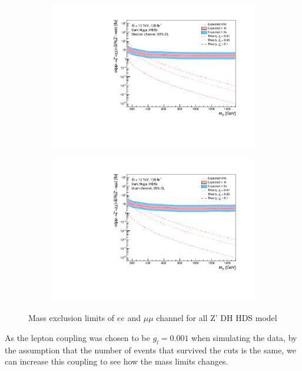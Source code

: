 \documentclass[12pt, a4paper]{book}
\begin{document}
\begin{figure}[!ht]
	\centering
   \begin{subfigure}[b]{0.49\textwidth}
      \centering
      \includegraphics[width=1\textwidth]{Limits/DH_HDS/mass_exclusion_ee.pdf}
      \end{subfigure}
   \hfill
   \begin{subfigure}[b]{0.49\textwidth}
      \centering
      \includegraphics[width=1\textwidth]{Limits/DH_HDS/mass_exclusion_uu.pdf}
      \end{subfigure}
   \caption{Mass exclusion limits of $ee$ and $\mu\mu$ channel for all Z' DH HDS model}\label{fig:DH_HDS_exclusion_ee_uu}
\end{figure}
As the lepton coupling was chosen to be $g_l=0.001$ when simulating the data, by the assumption that the number of events that survived the cuts is the same, we can increase this coupling to see how the mass limits changes.
\end{document}
